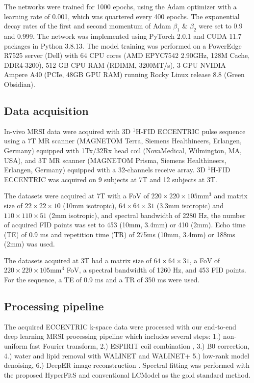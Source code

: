 \documentclass{article}
\begin{document}
        The networks were trained for 1000 epochs, using the Adam optimizer with a learning rate of 0.001, which was quartered every 400 epochs. The exponential decay rates of the first and second momentum of Adam $\beta_1$ \& $\beta_2$ were set to 0.9 and 0.999. The network was implemented using PyTorch 2.0.1 and CUDA 11.7 packages in Python 3.8.13. The model training was performed on a PowerEdge R7525 server (Dell) with 64 CPU cores (AMD EPYC7542 2.90GHz, 128M Cache, DDR4-3200), 512 GB CPU RAM (RDIMM, 3200MT/s), 3 GPU NVIDIA Ampere A40 (PCIe, 48GB GPU RAM) running Rocky Linux release 8.8 (Green Obsidian).
    
    \subsection{Data acquisition}
        In-vivo MRSI data were acquired with 3D $^1$H-FID ECCENTRIC pulse sequence using a 7T MR scanner (MAGNETOM Terra, Siemens Healthineers, Erlangen, Germany) equipped with 1Tx/32Rx head coil (NovaMedical, Wilmington, MA, USA), and 3T MR scanner (MAGNETOM Prisma, Siemens Healthineers, Erlangen, Germany) equipped with a 32-channels receive array. 3D $^1$H-FID ECCENTRIC was acquired on 9 subjects at 7T and 12 subjects at 3T.  
        
        The datasets were acquired at 7T with a  FoV of $220 \times 220 \times 105 \text{mm}^3$ and matrix size of $22 \times 22 \times 10$ (10mm isotropic), $64 \times 64 \times 31$ (3.3mm isotropic) and $110 \times 110 \times 51$ (2mm isotropic), and spectral bandwidth of 2280 Hz, the number of acquired FID points was set to 453 (10mm, 3.4mm) or 410 (2mm). Echo time (TE) of 0.9 ms and repetition time (TR) of 275ms (10mm, 3.4mm) or 188ms (2mm) was used. 

        The datasets acquired at 3T had a matrix size of $64 \times 64 \times 31$, a FoV of $220 \times 220 \times 105 \text{mm}^3$ FoV, a spectral bandwidth of 1260 Hz, and 453 FID points. For the sequence, a TE of 0.9 ms and a TR of 350 ms were used. 
    
    \subsection{Processing pipeline}
        The acquired ECCENTRIC k-space data were processed with our end-to-end deep learning MRSI processing pipeline \cite{weiser2025deep} which includes several steps: 1.) non-uniform fast Fourier transform, 2.) ESPIRIT coil combination \cite{uecker2014espirit}, 3.) B0 correction, 4.) water and lipid removal with WALINET \cite{weiser2025walinet} and WALINET+ \cite{weiser2025walinet, weiserwalinet+} 5.) low-rank model \cite{klauser2024eccentric} denoising, 6.) DeepER image reconstruction \cite{weiser2025deep}. Spectral fitting was performed with the proposed HyperFitS and conventional LCModel \cite{provencher1993estimation} as the gold standard method.
\end{document}
